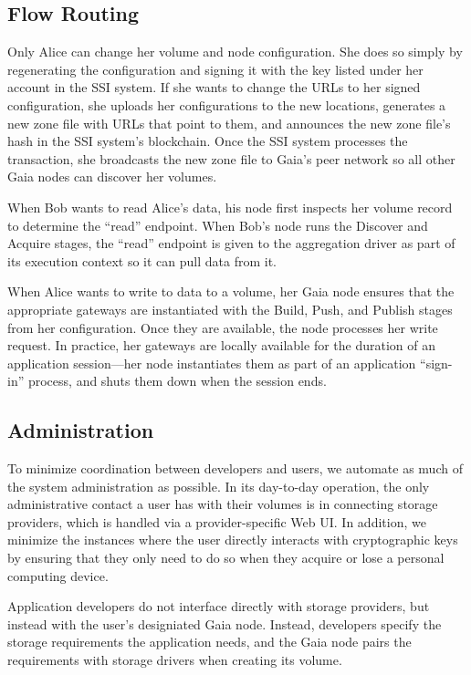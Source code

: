 \subsection{Flow Routing}

Only Alice can change her volume and node configuration.  She does so simply by
regenerating the configuration and signing it with the key listed under her
account in the SSI system.  If she wants to change the URLs to her signed
configuration, she uploads her configurations to the new locations, generates a
new zone file with URLs that point to them, and announces the new zone file's
hash in the SSI system's blockchain.  Once the SSI system processes the
transaction, she broadcasts the new zone file to Gaia's peer network so all
other Gaia nodes can discover her volumes.

When Bob wants to read Alice's data, his node first inspects her volume record
to determine the ``read'' endpoint.  When Bob's node runs the Discover and
Acquire stages, the ``read'' endpoint is given to the aggregation driver as part
of its execution context so it can pull data from it.

When Alice wants to write to data to a volume, her Gaia node ensures that the
appropriate gateways are instantiated with the Build, Push, and Publish stages
from her configuration.  Once they are available, the node processes her write
request.  In practice, her gateways are locally available for the duration of an
application session---her node instantiates them as part of an application
``sign-in'' process, and shuts them down when the session ends.

\subsection{Administration}

To minimize coordination between developers and users, we
automate as much of the system administration as possible.
In its day-to-day operation, the only administrative contact a user has with their volumes is
in connecting storage providers, which is handled via a provider-specific Web
UI.  In addition, we minimize the instances where the user directly interacts with cryptographic keys
by ensuring that they only need to do so when they acquire or lose a personal
computing device.

Application developers do not interface directly with storage providers, but
instead with the user's designiated Gaia node.
Instead, developers specify the storage requirements the
application needs, and the Gaia node pairs the requirements with storage drivers
when creating its volume.

